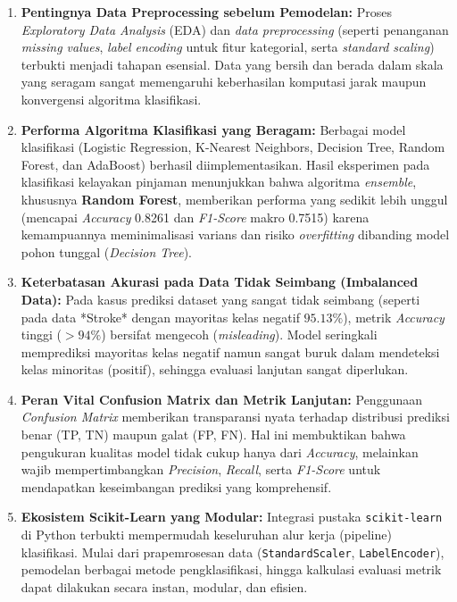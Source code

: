 \documentclass[a4paper,oneside,11pt]{book}
\begin{document}
\begin{enumerate}
    \item \textbf{Pentingnya Data Preprocessing sebelum Pemodelan:} Proses \textit{Exploratory Data Analysis} (EDA) dan \textit{data preprocessing} (seperti penanganan \textit{missing values}, \textit{label encoding} untuk fitur kategorial, serta \textit{standard scaling}) terbukti menjadi tahapan esensial. Data yang bersih dan berada dalam skala yang seragam sangat memengaruhi keberhasilan komputasi jarak maupun konvergensi algoritma klasifikasi.
    
    \item \textbf{Performa Algoritma Klasifikasi yang Beragam:} Berbagai model klasifikasi (Logistic Regression, K-Nearest Neighbors, Decision Tree, Random Forest, dan AdaBoost) berhasil diimplementasikan. Hasil eksperimen pada klasifikasi kelayakan pinjaman menunjukkan bahwa algoritma \textit{ensemble}, khususnya \textbf{Random Forest}, memberikan performa yang sedikit lebih unggul (mencapai \textit{Accuracy} 0.8261 dan \textit{F1-Score} makro 0.7515) karena kemampuannya meminimalisasi varians dan risiko \textit{overfitting} dibanding model pohon tunggal (\textit{Decision Tree}).
    
    \item \textbf{Keterbatasan Akurasi pada Data Tidak Seimbang (Imbalanced Data):} Pada kasus prediksi dataset yang sangat tidak seimbang (seperti pada data *Stroke* dengan mayoritas kelas negatif $95.13\%$), metrik \textit{Accuracy} tinggi ($>94\%$) bersifat mengecoh (\textit{misleading}). Model seringkali memprediksi mayoritas kelas negatif namun sangat buruk dalam mendeteksi kelas minoritas (positif), sehingga evaluasi lanjutan sangat diperlukan.
    
    \item \textbf{Peran Vital Confusion Matrix dan Metrik Lanjutan:} Penggunaan \textit{Confusion Matrix} memberikan transparansi nyata terhadap distribusi prediksi benar (TP, TN) maupun galat (FP, FN). Hal ini membuktikan bahwa pengukuran kualitas model tidak cukup hanya dari \textit{Accuracy}, melainkan wajib mempertimbangkan \textit{Precision}, \textit{Recall}, serta \textit{F1-Score} untuk mendapatkan keseimbangan prediksi yang komprehensif.
    
    \item \textbf{Ekosistem Scikit-Learn yang Modular:} Integrasi pustaka \texttt{scikit-learn} di Python terbukti mempermudah keseluruhan alur kerja (pipeline) klasifikasi. Mulai dari prapemrosesan data (\texttt{StandardScaler}, \texttt{LabelEncoder}), pemodelan berbagai metode pengklasifikasi, hingga kalkulasi evaluasi metrik dapat dilakukan secara instan, modular, dan efisien.
\end{enumerate}
\end{document}
